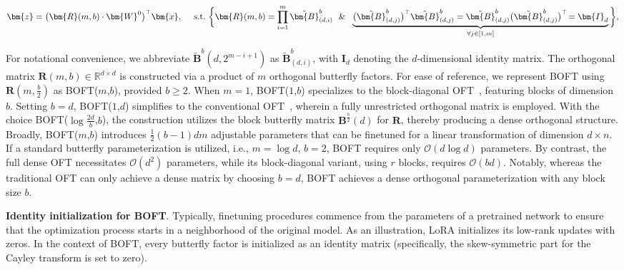 \begin{equation}
    \begin{aligned}\nonumber
    \bm{z}=\big(\bm{R}(m,b)\cdot\bm{W}^0\big)^\top\bm{x},~~~~\text{s.t.}~\bigg{\{}\bm{R}(m,b)=\prod_{i=1}^m \tilde{\bm{B}}^b_{(d,i)}~~\&~~\underbrace{\big(\tilde{\bm{B}}^b_{(d,j)}\big)^\top\tilde{\bm{B}}^b_{(d,j)}=\tilde{\bm{B}}^b_{(d,j)}\big(\tilde{\bm{B}}^b_{(d,j)}\big)^\top\!=\bm{I}_d}_{\forall j\in [1, m]}\bigg{\}},
    \end{aligned}
\end{equation}

For notational convenience, we abbreviate $\tilde{\bm{B}}^b(d,2^{m - i+1})$ as $\tilde{\bm{B}}^b_{(d,i)}$, with $\bm{I}_d$ denoting the $d$-dimensional identity matrix. The orthogonal matrix $\bm{R}(m,b)\in\mathbb{R}^{d\times d}$ is constructed via a product of $m$ orthogonal butterfly factors. For ease of reference, we represent BOFT using $\bm{R}(m,\frac{b}{2})$ as BOFT($m$,$b$), provided $b\geq 2$. When $m=1$, BOFT($1$,$b$) specializes to the block-diagonal OFT~\cite{qiu2023controlling}, featuring blocks of dimension $b$. Setting $b=d$, BOFT($1$,$d$) simplifies to the conventional OFT~\cite{qiu2023controlling}, wherein a fully unrestricted orthogonal matrix is employed. With the choice BOFT($\log \frac{2d}{b}$,$b$), the construction utilizes the block butterfly matrix $\bm{B}^{\frac{b}{2}}(d)$ for $\bm{R}$, thereby producing a dense orthogonal structure. Broadly, BOFT($m$,$b$) introduces $\frac{1}{2}(b-1)dm$ adjustable parameters that can be finetuned for a linear transformation of dimension $d\times n$. If a standard butterfly parameterization is utilized, i.e., $m=\log d$, $b=2$, BOFT requires only $\mathcal{O}(d\log d)$ parameters. By contrast, the full dense OFT necessitates $\mathcal{O}(d^2)$ parameters, while its block-diagonal variant, using $r$ blocks, requires $\mathcal{O}(bd)$. Notably, whereas the traditional OFT can only achieve a dense matrix by choosing $b=d$, BOFT achieves a dense orthogonal parameterization with any block size $b$.

\textbf{Identity initialization for BOFT}. Typically, finetuning procedures commence from the parameters of a pretrained network to ensure that the optimization process starts in a neighborhood of the original model. As an illustration, LoRA initializes its low-rank updates with zeros. In the context of BOFT, every butterfly factor is initialized as an identity matrix (specifically, the skew-symmetric part for the Cayley transform is set to zero).

